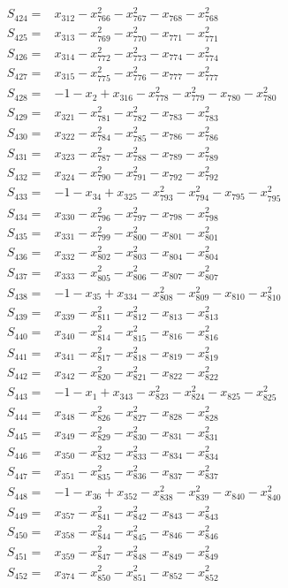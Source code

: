 \begin{align*}
S_{424}={}&x_{312}-x_{766}^{2}-x_{767}^{2}-x_{768}-x_{768}^{2}\\[3pt]
S_{425}={}&x_{313}-x_{769}^{2}-x_{770}^{2}-x_{771}-x_{771}^{2}\\[3pt]
S_{426}={}&x_{314}-x_{772}^{2}-x_{773}^{2}-x_{774}-x_{774}^{2}\\[3pt]
S_{427}={}&x_{315}-x_{775}^{2}-x_{776}^{2}-x_{777}-x_{777}^{2}\\[3pt]
S_{428}={}&-1-x_{2}+x_{316}-x_{778}^{2}-x_{779}^{2}-x_{780}-x_{780}^{2}\\[3pt]
S_{429}={}&x_{321}-x_{781}^{2}-x_{782}^{2}-x_{783}-x_{783}^{2}\\[3pt]
S_{430}={}&x_{322}-x_{784}^{2}-x_{785}^{2}-x_{786}-x_{786}^{2}\\[3pt]
S_{431}={}&x_{323}-x_{787}^{2}-x_{788}^{2}-x_{789}-x_{789}^{2}\\[3pt]
S_{432}={}&x_{324}-x_{790}^{2}-x_{791}^{2}-x_{792}-x_{792}^{2}\\[3pt]
S_{433}={}&-1-x_{34}+x_{325}-x_{793}^{2}-x_{794}^{2}-x_{795}-x_{795}^{2}\\[3pt]
S_{434}={}&x_{330}-x_{796}^{2}-x_{797}^{2}-x_{798}-x_{798}^{2}\\[3pt]
S_{435}={}&x_{331}-x_{799}^{2}-x_{800}^{2}-x_{801}-x_{801}^{2}\\[3pt]
S_{436}={}&x_{332}-x_{802}^{2}-x_{803}^{2}-x_{804}-x_{804}^{2}\\[3pt]
S_{437}={}&x_{333}-x_{805}^{2}-x_{806}^{2}-x_{807}-x_{807}^{2}\\[3pt]
S_{438}={}&-1-x_{35}+x_{334}-x_{808}^{2}-x_{809}^{2}-x_{810}-x_{810}^{2}\\[3pt]
S_{439}={}&x_{339}-x_{811}^{2}-x_{812}^{2}-x_{813}-x_{813}^{2}\\[3pt]
S_{440}={}&x_{340}-x_{814}^{2}-x_{815}^{2}-x_{816}-x_{816}^{2}\\[3pt]
S_{441}={}&x_{341}-x_{817}^{2}-x_{818}^{2}-x_{819}-x_{819}^{2}\\[3pt]
S_{442}={}&x_{342}-x_{820}^{2}-x_{821}^{2}-x_{822}-x_{822}^{2}\\[3pt]
S_{443}={}&-1-x_{1}+x_{343}-x_{823}^{2}-x_{824}^{2}-x_{825}-x_{825}^{2}\\[3pt]
S_{444}={}&x_{348}-x_{826}^{2}-x_{827}^{2}-x_{828}-x_{828}^{2}\\[3pt]
S_{445}={}&x_{349}-x_{829}^{2}-x_{830}^{2}-x_{831}-x_{831}^{2}\\[3pt]
S_{446}={}&x_{350}-x_{832}^{2}-x_{833}^{2}-x_{834}-x_{834}^{2}\\[3pt]
S_{447}={}&x_{351}-x_{835}^{2}-x_{836}^{2}-x_{837}-x_{837}^{2}\\[3pt]
S_{448}={}&-1-x_{36}+x_{352}-x_{838}^{2}-x_{839}^{2}-x_{840}-x_{840}^{2}\\[3pt]
S_{449}={}&x_{357}-x_{841}^{2}-x_{842}^{2}-x_{843}-x_{843}^{2}\\[3pt]
S_{450}={}&x_{358}-x_{844}^{2}-x_{845}^{2}-x_{846}-x_{846}^{2}\\[3pt]
S_{451}={}&x_{359}-x_{847}^{2}-x_{848}^{2}-x_{849}-x_{849}^{2}\\[3pt]
S_{452}={}&x_{374}-x_{850}^{2}-x_{851}^{2}-x_{852}-x_{852}^{2}\\[3pt]
\end{align*}
\endgroup
